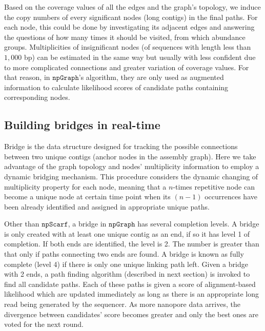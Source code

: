 \documentclass[10pt,twocolumn,twoside]{genpaper}
\newcommand{\npscarf}{$\mathtt{npScarf}$}
\newcommand{\npgraph}{$\mathtt{npGraph}$}
\begin{document}
Based on the coverage values of all the edges and the graph's topology, we induce the copy numbers of every significant nodes (long contigs) in the final paths.
For each node, this could be done by investigating its adjacent edges and answering the questions of how many times it should be visited, from which abundance groups.
Multiplicities of insignificant nodes (of sequences with length less than $1,000$ bp) can be estimated in the same way but usually with less confident due to more complicated connections and greater variation of coverage values. 
For that reason, in \npgraph{}'s algorithm, they are only used as augmented information to calculate likelihood scores of candidate paths containing corresponding nodes.

\subsection*{Building bridges in real-time}
Bridge is the data structure designed for tracking the possible connections between two unique contigs (anchor nodes in the assembly graph).
Here we take advantage of the graph topology and nodes' multiplicity information to employ a dynamic bridging mechanism.
This procedure considers the dynamic changing of multiplicity property for each node, meaning that a $n$-times repetitive node can become a unique node at certain time point when its $(n-1)$ occurrences have been already identified and assigned in appropriate unique paths. 

Other than \npscarf{}, a bridge in \npgraph{} has several completion levels. A bridge is only created with at least one unique contig as an end, if so it has level 1 of completion. If both ends are identified, the level is 2. The number is greater than that only if paths connecting two ends are found. A bridge is known as fully complete (level 4) if there is only one unique linking path left. Given a bridge with 2 ends, a path finding algorithm (described in next section) is invoked to find all candidate paths. Each of these paths is given a score of alignment-based likelihood which are updated immediately as long as there is an appropriate long read being generated by the sequencer. As more nanopore data arrives, the divergence between candidates' score becomes greater and only the best ones are voted for the next round.
\end{document}
